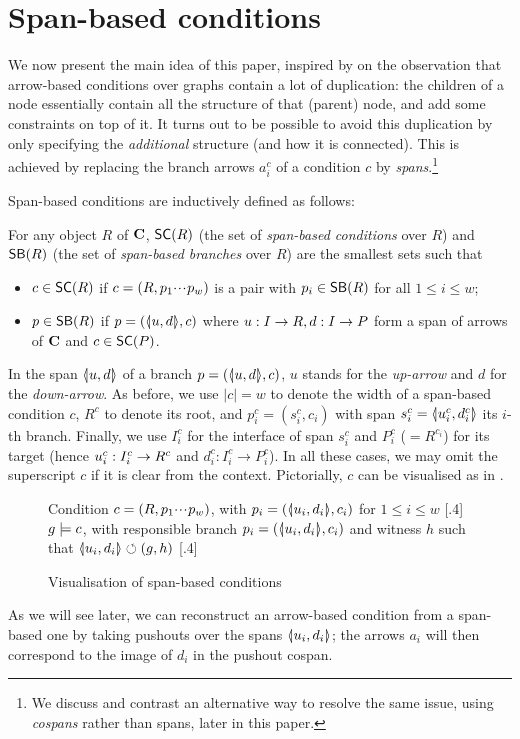 \section{Span-based conditions}

We now present the main idea of this paper, inspired by on the observation that arrow-based conditions over graphs contain a lot of duplication: the children of a node essentially contain all the structure of that (parent) node, and add some constraints on top of it. It turns out to be possible to avoid this duplication by only specifying the \emph{additional} structure (and how it is connected). This is achieved by replacing the branch arrows $a^c_i$ of a condition $c$ by \emph{spans}.\footnote{We discuss and contrast an alternative way to resolve the same issue, using \emph{cospans} rather than spans, later in this paper.}

Span-based conditions are inductively defined as follows:

\begin{definition}
  For any object $R$ of $\mathbf{C}$, $\SC R$ (the set of \emph{span-based conditions} over $R$) and $\SB R$ (the set of \emph{span-based branches} over $R$) are the smallest sets such that
  \begin{itemize}
  \item $c\in \SC R$ if $c=(R,p_1{\cdotp\mkern-2mu\cdotp\mkern-2mu\cdotp\mkern1mu} p_w)$ is a pair with $p_i\in \SB R$ for all $1\leq i\leq w$;
  \item $p\in \SB R$ if $p=(\spanof u d,c)$ where $u: I\to R, d:I\rightarrow P$ form a span of arrows of $\mathbf{C}$ and $c\in \SC P$.
  \end{itemize}
\end{definition}
%
In the span $\spanof u d$ of a branch $p=(\spanof u d,c)$, $u$ stands for the \emph{up-arrow} and $d$ for the \emph{down-arrow}. As before, we use $|c|=w$ to denote the width of a span-based condition $c$, $R^c$ to denote its root, and $p^c_i=(s^c_i,c_i)$ with span $s^c_i=\spanof{u^c_i}{d^c_i}$ its $i$-th branch. Finally, we use $I^c_i$ for the interface of span $s^c_i$ and $P^c_i$ ($=R^{c_i}$) for its target (hence $u^c_i:I^c_i\rightarrow R^c$ and $d^c_i:I^c_i\rightarrow P^c_i$). In all these cases, we may omit the superscript $c$ if it is clear from the context. Pictorially, $c$ can be visualised as in .
%
\begin{figure}
\centering
\subcaptionbox
  {Condition $c=(R,p_1{\cdotp\mkern-2mu\cdotp\mkern-2mu\cdotp\mkern1mu} p_w)$, with $p_i=(\spanof{u_i}{d_i},c_i)$ for $1\leq i\leq w$
   }
  [.4\textwidth]
  {}
\qquad
\subcaptionbox
  {$g\models c$, with responsible branch $p_i=(\spanof{u_i}{d_i},c_i)$ and witness $h$ such that $\spanof{u_i}{d_i}\commutes (g,h)$
   }
  [.4\textwidth]
  {}
\caption{Visualisation of span-based conditions}
\end{figure}
%
As we will see later, we can reconstruct an arrow-based condition from a span-based one by taking pushouts over the spans $\spanof{u_i}{d_i}$; the arrows $a_i$ will then correspond to the image of $d_i$ in the pushout cospan.

